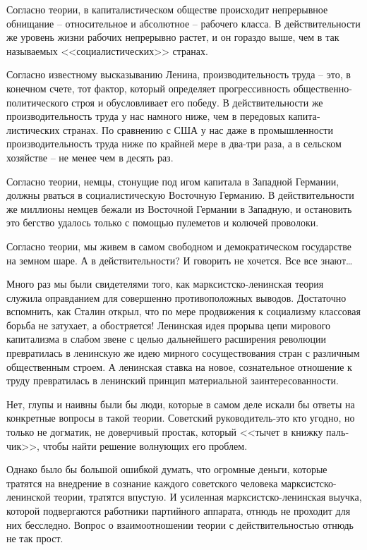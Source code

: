 \documentclass{book}
\begin{document}
Согласно теории, в капиталистическом обществе происхо­дит непрерывное обнищание -- относительное и абсолютное -- рабочего класса. 
В действительности же уровень жизни рабо­чих непрерывно растет, и он гораздо выше, чем в так называе­мых <<социалистических>> 
странах.

Согласно известному высказыванию Ленина, производительность труда -- это, в конечном счете, тот фактор, который опре­деляет 
прогрессивность общественно-политического строя и обусловливает его победу. В действительности же производи­тельность труда у нас 
намного ниже, чем в передовых капита­листических странах. По сравнению с США у нас даже в про­мышленности производительность труда 
ниже по крайней мере в два-три раза, а в сельском хозяйстве -- не менее чем в десять раз.

Согласно теории, немцы, стонущие под игом капитала в За­падной Германии, должны рваться в социалистическую Восточ­ную Германию. В 
действительности же миллионы немцев бежа­ли из Восточной Германии в Западную, и остановить это бегст­во удалось только с помощью 
пулеметов и колючей прово­локи.

Согласно теории, мы живем в самом свободном и демокра­тическом государстве на земном шаре. А в действительности? И говорить не 
хочется. Все все знают\ldots

Много раз мы были свидетелями того, как марксистско-ленинская теория служила оправданием для совершенно противоположных выводов. 
Достаточно вспомнить, как Сталин открыл, что по мере продвижения к социализму классовая борьба не затухает, а обостряется! 
Ленинская идея прорыва цепи мирового капитализма в слабом звене с целью дальней­шего расширения революции превратилась в 
ленинскую же идею мирного сосуществования стран с различным общест­венным строем. А ленинская ставка на новое, сознательное 
отношение к труду превратилась в ленинский принцип мате­риальной заинтересованности.

Нет, глупы и наивны были бы люди, которые в самом деле искали бы ответы на конкретные вопросы в такой теории. Советский 
руководитель-это кто угодно, но только не догма­тик, не доверчивый простак, который <<тычет в книжку паль­чик>>, чтобы найти решение 
волнующих его проблем.

Однако было бы большой ошибкой думать, что огромные деньги, которые тратятся на внедрение в сознание каждого советского человека 
марксистско-ленинской теории, тратятся впустую. И усиленная марксистско-ленинская выучка, кото­рой подвергаются работники 
партийного аппарата, отнюдь не проходит для них бесследно. Вопрос о взаимоотношении тео­рии с действительностью отнюдь не так 
прост.
\end{document}
